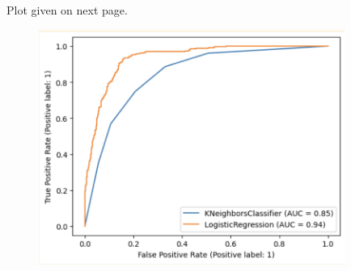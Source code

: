 \documentclass[a4paper]{article}
\theoremstyle{definition}
\newenvironment{soln}{
    \leavevmode\color{blue}\ignorespaces
}{}
\begin{document}
\begin{enumerate}
	\begin{soln}
		Plot given on next page.
	\end{soln}

	\pagebreak
	
	\begin{soln}
		\begin{figure}[t]
			\centering
			\includegraphics[width=10cm]{figures/Q2_5.png}
		\end{figure}
	\end{soln}
	
\end{enumerate}

\end{document}
